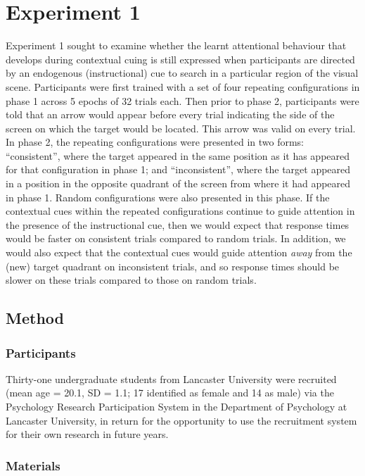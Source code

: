 \documentclass[
  man,
  floatsintext,
  longtable,
  nolmodern,
  notxfonts,
  notimes,
  colorlinks=true,linkcolor=blue,citecolor=blue,urlcolor=blue]{apa7}
\begin{document}
\section{Experiment 1}\label{experiment-1}

Experiment 1 sought to examine whether the learnt attentional behaviour
that develops during contextual cuing is still expressed when
participants are directed by an endogenous (instructional) cue to search
in a particular region of the visual scene. Participants were first
trained with a set of four repeating configurations in phase 1 across 5
epochs of 32 trials each. Then prior to phase 2, participants were told
that an arrow would appear before every trial indicating the side of the
screen on which the target would be located. This arrow was valid on
every trial. In phase 2, the repeating configurations were presented in
two forms: ``consistent'', where the target appeared in the same
position as it has appeared for that configuration in phase 1; and
``inconsistent'', where the target appeared in a position in the
opposite quadrant of the screen from where it had appeared in phase 1.
Random configurations were also presented in this phase. If the
contextual cues within the repeated configurations continue to guide
attention in the presence of the instructional cue, then we would expect
that response times would be faster on consistent trials compared to
random trials. In addition, we would also expect that the contextual
cues would guide attention \emph{away} from the (new) target quadrant on
inconsistent trials, and so response times should be slower on these
trials compared to those on random trials.

\subsection{Method}\label{method}

\subsubsection{Participants}\label{participants}

Thirty-one undergraduate students from Lancaster University were
recruited (mean age = 20.1, SD = 1.1; 17 identified as female and 14 as
male) via the Psychology Research Participation System in the Department
of Psychology at Lancaster University, in return for the opportunity to
use the recruitment system for their own research in future years.

\subsubsection{Materials}\label{materials}
\end{document}
